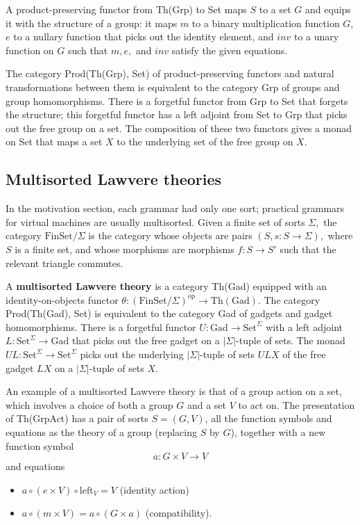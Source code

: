 \documentclass{article}
\newcommand{\maps}{\colon}
\newcommand{\FinSet}{\mathrm{FinSet}}
\newcommand{\Set}{\mathrm{Set}}
\newcommand{\Gad}{\mathrm{Gad}}
\newcommand{\op}{\mathrm{op}}
\begin{document}
A product-preserving functor from Th(Grp) to Set maps $S$ to a set $G$ and equips it with the structure of a group: it maps $m$ to a binary multiplication function $G$, $e$ to a nullary function that picks out the identity element, and $inv$ to a unary function on $G$ such that $m, e,$ and $inv$ satisfy the given equations.

The category Prod(Th(Grp), Set) of product-preserving functors and natural transformations between them is equivalent to the category Grp of groups and group homomorphisms.  There is a forgetful functor from Grp to Set that forgets the structure; this forgetful functor has a left adjoint from Set to Grp that picks out the free group on a set.  The composition of these two functors gives a monad on Set that maps a set $X$ to the underlying set of the free group on $X.$

\subsection{Multisorted Lawvere theories}
In the motivation section, each grammar had only one sort; practical grammars for virtual machines are usually multisorted.  Given a finite set of sorts $\Sigma,$ the category $\FinSet/\Sigma$ is the category whose objects are pairs $(S, s\maps S\to \Sigma),$ where $S$ is a finite set, and whose morphisms are morphisms $f\maps S \to S'$ such that the relevant triangle commutes.

A {\bf multisorted Lawvere theory} is a category Th(Gad) equipped with an identity-on-objects functor ${\theta\maps (\FinSet/\Sigma)^\op \to \mathrm{Th(Gad)}.}$  The category Prod(\allowbreak Th(Gad), Set) is equivalent to the category Gad of gadgets and gadget homomorphisms.  There is a forgetful functor ${U\maps \Gad \to \Set^\Sigma}$ with a left adjoint ${L\maps \Set^\Sigma \to \Gad}$ that picks out the free gadget on a $|\Sigma|$-tuple of sets.  The monad ${UL\maps \Set^\Sigma \to \Set^\Sigma}$ picks out the underlying $|\Sigma|$-tuple of sets $ULX$ of the free gadget $LX$ on a $|\Sigma|$-tuple of sets $X$.

An example of a multisorted Lawvere theory is that of a group action on a set, which involves a choice of both a group $G$ and a set $V$ to act on.  The presentation of Th(GrpAct) has a pair of sorts $S = (G, V)$, all the function symbols and equations as the theory of a group (replacing $S$ by $G$), together with a new function symbol
\[ a\maps G \times V \to V \]
and equations
\begin{itemize}
  \item $a \circ (e \times V) \circ \mathrm{left}_V = V$ (identity action)
  \item $a \circ (m \times V) = a \circ (G \times a)$ (compatibility).
\end{itemize}
\end{document}
